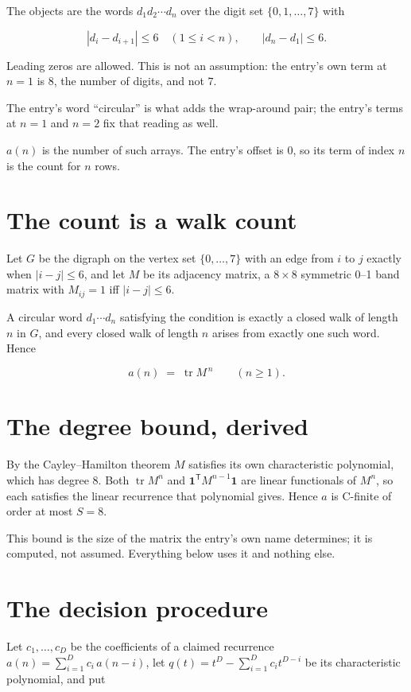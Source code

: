 \documentclass[11pt]{article}
\theoremstyle{definition}
\begin{document}
The objects are the words $d_1 d_2 \cdots d_n$ over the digit set $\{0,1,\dots,7\}$ with

\[|d_i - d_{i+1}| \le 6\quad (1 \le i < n), \qquad |d_n - d_1| \le 6.\]

Leading zeros are allowed. This is not an assumption: the entry's own term at $n=1$ is $8$, the number of digits, and not $7$.

The entry's word ``circular'' is what adds the wrap-around pair; the entry's terms at $n = 1$ and $n = 2$ fix that reading as well.

$a(n)$ is the number of such arrays. The entry's offset is 0, so its term of index $n$ is the count for $n$ rows.

\section{The count is a walk count}

Let $G$ be the digraph on the vertex set $\{0,\dots,7\}$ with an edge from $i$ to $j$ exactly when $|i-j| \le 6$, and let $M$ be its adjacency matrix, a $8 \times 8$ symmetric 0--1 band matrix with $M_{ij} = 1$ iff $|i-j| \le 6$.

A circular word $d_1\cdots d_n$ satisfying the condition is exactly a closed walk of length $n$ in $G$, and every closed walk of length $n$ arises from exactly one such word. Hence

\[a(n) \;=\; \operatorname{tr} M^{\,n} \qquad (n \ge 1).\]

\section{The degree bound, derived}

By the Cayley--Hamilton theorem $M$ satisfies its own characteristic polynomial, which has degree $8$. Both $\operatorname{tr} M^n$ and $\mathbf 1^{\mathsf T} M^{n-1} \mathbf 1$ are linear functionals of $M^{n}$, so each satisfies the linear recurrence that polynomial gives. Hence $a$ is C-finite of order at most $S = 8$.

This bound is the size of the matrix the entry's own name determines; it is computed, not assumed. Everything below uses it and nothing else.

\section{The decision procedure}

Let $c_1,\dots,c_D$ be the coefficients of a claimed recurrence $a(n) = \sum_{i=1}^{D} c_i\,a(n-i)$, let $q(t) = t^{D} - \sum_{i=1}^{D} c_i t^{D-i}$ be its characteristic polynomial, and put
\end{document}
